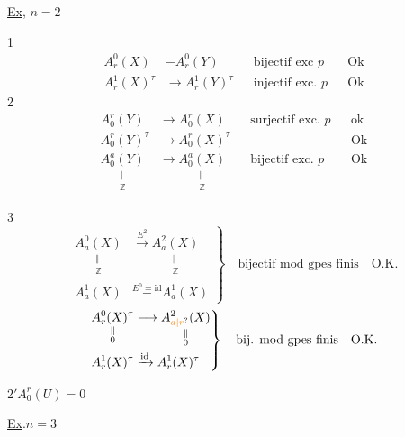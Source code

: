 
\uline{Ex}, \qquad $n=2$

\textcircled{1}
\[
\begin{aligned}
 A_r^0(X)&\mathord{-}A_r^0(Y)&&\text{bijectif exc $p$}&&\text{Ok}\\
 A_r^1(X)^\tau&\longrightarrow A_r^1(Y)^\tau&&\text{injectif exc. $p$}&&\text{Ok}
\end{aligned}
\]
\textcircled{2}
\[
\begin{aligned}
 A^r_0(Y)&\longrightarrow A^r_0(X)&&\text{surjectif exc. $p$}&&\text{ok}\\
 A^r_0(Y)^\tau&\longrightarrow A^r_0(X)^\tau&&\text{- - - ---}&&\text{Ok}\\
 \underset{\substack{\Vert\\\mathbb Z}}{A^a_0(Y)}&\longrightarrow
 \underset{\substack{\Vert\\\mathbb Z}}{A^a_0(X)}&&\text{bijectif exc. $p$}&&\text{Ok}
\end{aligned}
\]

\textcircled{3}
\[
\left.\begin{aligned}
 \underset{\substack{\Vert\\\mathbb Z}}{A_a^0(X)}&\xrightarrow{E^2}
 \underset{\substack{\Vert\\\mathbb Z}}{A_a^2(X)}\\
 A_a^1(X)&\overset{E^0=\mathrm{id}}{\mathord{-}}A_a^1(X)
\end{aligned}\right\}\quad\text{bijectif mod gpes finis}\quad\text{O.K.}
\]
\[
\left.\begin{aligned}
 \underset{\substack{\Vert\\0}}{A_r^0(X)^\tau}&\longrightarrow
 \underset{\substack{\Vert\\0}}{A_{\unsure{a|r}}^2(X)}\\
 A_r^1(X)^\tau&\xrightarrow{\mathrm{id}}A_r^1(X)^\tau
\end{aligned}\right\}\quad\text{bij. mod gpes finis}\quad\text{O.K.}
\]

\textcircled{$2'$}\qquad $A_0^r(U)=0$

\uline{Ex}.\quad $n=3$

